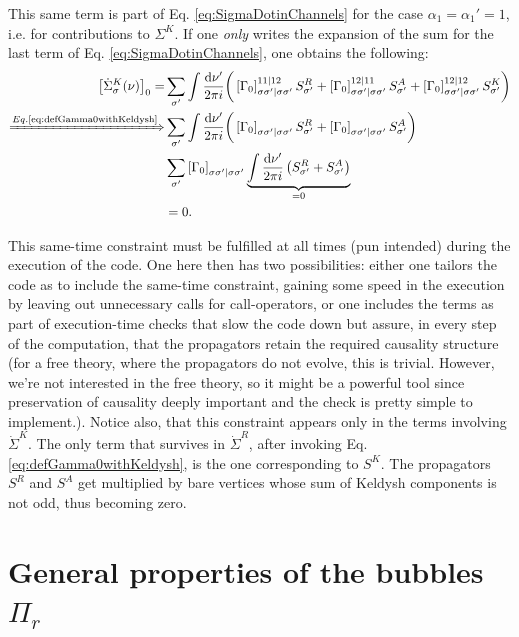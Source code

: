 \documentclass[12pt,a4paper,roman]{article}
\newcommand{\dd}{\mathrm{d}}
\begin{document}
This same term is part of Eq. \eqref{eq:SigmaDotinChannels} for the case $\alpha_1=\alpha_1' = 1$, i.e. for contributions to $\Sigma^K$. If one \textit{only} writes the expansion of the sum for the last term of Eq. \eqref{eq:SigmaDotinChannels}, one obtains the following:
\begin{align}
	\left[\dot{\Sigma}^K_\sigma(\nu)\right]_0 = &\sum_{\sigma'} \int \frac{\dd \nu'}{2\pi i}\bigg(\left[\Gamma_0\right]^{11|12}_{\sigma\sigma'|\sigma\sigma'} S_{\sigma'}^R  
	+ \left[\Gamma_0\right]^{12|11}_{\sigma\sigma'|\sigma\sigma'} S_{\sigma'}^A  
	+\left[\Gamma_0\right]^{12|12}_{\sigma\sigma'|\sigma\sigma'} S_{\sigma'}^K  \bigg) \\
	\xRightarrow{Eq. \text{\eqref{eq:defGamma0withKeldysh}}} &\sum_{\sigma'} \int \frac{\dd \nu'}{2\pi i}\bigg(\left[\Gamma_0\right]_{\sigma\sigma'|\sigma\sigma'} S_{\sigma'}^R  
	+ \left[\Gamma_0\right]_{\sigma\sigma'|\sigma\sigma'} S_{\sigma'}^A \bigg) \\
	&\sum_{\sigma'} \left[\Gamma_0\right]_{\sigma\sigma'|\sigma\sigma'}  \underbrace{\int\frac{\dd \nu'}{2\pi i} \left( S_{\sigma'}^R + S_{\sigma'}^A \right)}_{=0} \\
	& =0.
\end{align}

This same-time constraint must be fulfilled at all times (pun intended) during the execution of the code. One here then has two possibilities: either one tailors the code as to include the same-time constraint, gaining some speed in the execution by leaving out unnecessary calls for call-operators, or one includes the terms as part of execution-time checks that slow the code down but assure, in every step of the computation, that the propagators retain the required causality structure (for a free theory, where the propagators do not evolve, this is trivial. However, we're not interested in the free theory, so it might be a powerful tool since preservation of causality deeply important and the check is pretty simple to implement.). Notice also, that this constraint appears only in the terms involving $\dot{\Sigma}^K$. The only term that survives in $\dot{\Sigma}^R$, after invoking Eq. \eqref{eq:defGamma0withKeldysh}, is the one corresponding to $S^K$. The propagators $S^R$ and $S^A$ get multiplied by bare vertices whose sum of Keldysh components is not odd, thus becoming zero.


\section*{General properties of the bubbles $\Pi_r$}
\end{document}
